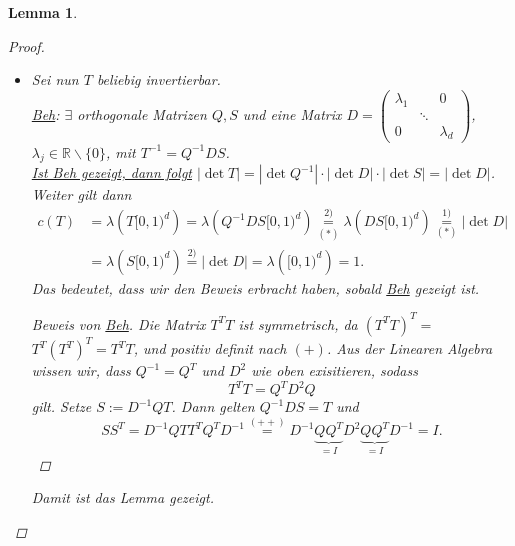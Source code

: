 \documentclass[a4paper]{scrreprt}
\newcommand{\R}{\mathbb{R}}
\theoremstyle{plain}
\newtheorem{lem}[thm]{Lemma}
\theoremstyle{definition}
\begin{document}
{{{{\begin{lem}
\begin{proof}
\begin{itemize}
            \item[3)]
                Sei nun $T$ beliebig invertierbar.\\
                \uline{Beh}: $\exists$ orthogonale Matrizen $Q,S$ und eine Matrix $D = \left(
                                                                                        \begin{smallmatrix}
                                                                                        \lambda_1 &        &  0       \\
                                                                                                & \ddots &          \\
                                                                                        0         &        & \lambda_d
                                                                                        \end{smallmatrix}
                                                                                       \right)$, $\lambda_j \in \R\backslash \{0\}$, mit $T^{-1} = Q^{-1}DS$.\\
                \uline{Ist Beh gezeigt, dann folgt} $|\det T| = |\det Q^{-1}| \cdot |\det D| \cdot |\det S| = |\det D|$. Weiter gilt dann
                \[
                    \begin{split}
                        c(T) &= \lambda\left(T[0,1)^d\right) = \lambda\left(Q^{-1}DS[0,1)^d\right) \underset{(*)}{\overset{2)}{=}} \lambda\left(DS[0,1)^d\right) \overset{1)}{\underset{(*)}{=}} |\det D|\\
                        &=\lambda\left(S[0,1)^d\right) \overset{2)}{=} |\det D| = \lambda\left([0,1)^d\right) = 1.
                    \end{split}
                \]
                Das bedeutet, dass wir den Beweis erbracht haben, sobald \uline{Beh} gezeigt ist.
                \begin{proof}[Beweis von \uline{Beh}]
                    Die Matrix $T^TT$ ist symmetrisch, da $\left(T^TT \right)^T =$\\$T^T \left(T^T\right)^T = T^TT$, und positiv definit nach $(+)$. Aus der Linearen Algebra wissen wir, dass $Q^{-1} = Q^T$ und $D^2$ wie oben exisitieren, sodass
                    \[
                        \tag{$++$}
                        T^TT=Q^TD^2Q
                    \]
                    gilt. Setze $S:=D^{-1}QT$. Dann gelten $Q^{-1}DS = T$ und
                    \[
                        SS^T = D^{-1}QTT^TQ^TD^{-1} \overset{(++)}{=} D^{-1}\underbrace{QQ^T}_{=I}D^2 \underbrace{QQ^T}_{=I} D^{-1} = I.
                    \]
                \end{proof}
                Damit ist das Lemma gezeigt.
        \end{itemize}
    \end{proof}
\end{lem}

}}}}
\end{document}
